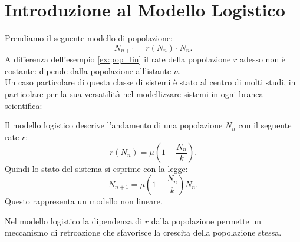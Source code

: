 \section{Introduzione al Modello Logistico}%
\label{sub:Introduzione al Modello Logistico}
Prendiamo il seguente modello di popolazione:
\[
    N_{n+1} = r(N_n)\cdot N_n
.\] 
A differenza dell'esempio \ref{ex:pop_lin} il rate della popolazione $r$ adesso non è costante: dipende dalla popolazione all'istante $n$.\\
Un caso particolare di questa classe di sistemi è stato al centro di molti studi, in particolare per la sua versatilità nel modellizzare sistemi in ogni branca scientifica:
\begin{defn}
    Il modello logistico descrive l'andamento di una popolazione $N_n$ con il seguente rate $r$:
    \[
	r(N_n) = \mu\left(1-\frac{N_n}{k}\right) 
    .\] 
    Quindi lo stato del sistema si esprime con la legge:
    \[
        N_{n+1} = \mu\left(1-\frac{N_n}{k}\right)N_n
    .\] 
    Questo rappresenta un modello non lineare.
\end{defn}
\noindent
Nel modello logistico la dipendenza di $r$ dalla popolazione permette un meccanismo di retroazione che sfavorisce la crescita della popolazione stessa.
\clearpage
